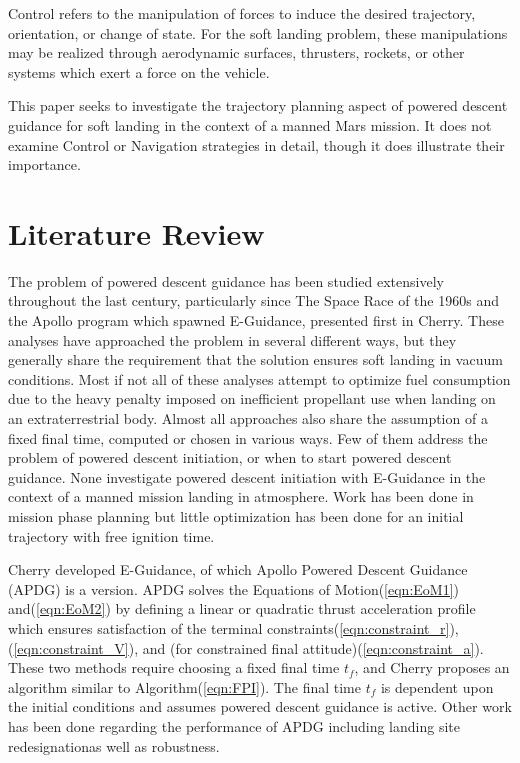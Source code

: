 Control refers to the manipulation of forces to induce the desired trajectory, orientation, or change of state. For the soft landing problem, these manipulations may be realized through aerodynamic surfaces, thrusters, rockets, or other systems which exert a force on the vehicle.

This paper seeks to investigate the trajectory planning aspect of powered descent guidance for soft landing in the context of a manned Mars mission. It does not examine Control or Navigation strategies in detail, though it does illustrate their importance.

\section{Literature Review}
The problem of powered descent guidance has been studied extensively throughout the last century, particularly since The Space Race of the 1960s and the Apollo program which spawned E-Guidance, presented first in Cherry\:\cite{CHERRY}. These analyses have approached the problem in several different ways, but they generally share the requirement that the solution ensures soft landing in vacuum conditions. Most if not all of these analyses attempt to optimize fuel consumption due to the heavy penalty imposed on inefficient propellant use when landing on an extraterrestrial body. Almost all approaches also share the assumption of a fixed final time, computed or chosen in various ways. Few of them address the problem of powered descent initiation, or when to start powered descent guidance. None investigate powered descent initiation with E-Guidance in the context of a manned mission landing in atmosphere. Work has been done in mission phase planning but little optimization has been done for an  initial trajectory with free ignition time.

Cherry developed E-Guidance, of which Apollo Powered Descent Guidance (APDG) is a version. APDG solves the Equations of Motion\:(\ref{eqn:EoM1}) and\:(\ref{eqn:EoM2}) by defining a linear or quadratic thrust acceleration profile which ensures satisfaction of the terminal constraints\:(\ref{eqn:constraint_r}),\:(\ref{eqn:constraint_V}), and (for constrained final attitude)\:(\ref{eqn:constraint_a}). These two methods require choosing a fixed final time $t_f$, and Cherry proposes an algorithm similar to Algorithm\:(\ref{eqn:FPI}). The final time $t_f$ is dependent upon the initial conditions and assumes powered descent guidance is active. Other work has been done regarding the performance of APDG including landing site redesignation as well as robustness. 

